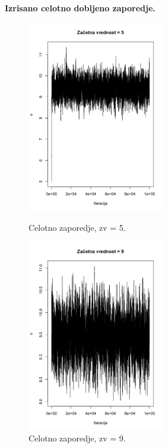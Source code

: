 \documentclass[a4paper,11pt]{article}
\begin{document}
\noindent
\textbf{Izrisano celotno dobljeno zaporedje.}
    \begin{figure}[ht!]
        \begin{minipage}{0.5\textwidth}
            \centering
            \includegraphics[width = 60mm]{Slike/2_1_zv5.png}
            \caption{Celotno zaporedje, zv = 5.}
        \end{minipage}
        \begin{minipage}{0.5\textwidth}
            \centering
            \includegraphics[width = 60mm]{Slike/2_1_zv9.png}
            \caption{Celotno zaporedje, zv = 9.}
        \end{minipage}
    \end{figure}
\end{document}
